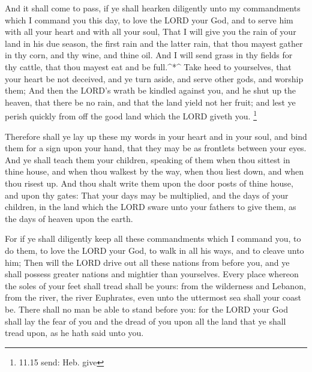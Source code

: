  And it shall come to pass, if ye shall hearken diligently
unto my commandments which I command you this day, to love the LORD your
God, and to serve him with all your heart and with all your soul,
 That I will give you the rain of your land in his due
season, the first rain and the latter rain, that thou mayest gather in
thy corn, and thy wine, and thine oil.  And I will send
grass in thy fields for thy cattle, that thou mayest eat and be
full.\^{}*\^{}  Take heed to yourselves, that your heart be
not deceived, and ye turn aside, and serve other gods, and worship them;
 And then the LORD's wrath be kindled against you, and he
shut up the heaven, that there be no rain, and that the land yield not
her fruit; and lest ye perish quickly from off the good land which the
LORD giveth you. \footnote{11.15 send: Heb. give}

 Therefore shall ye lay up these my words in your heart and
in your soul, and bind them for a sign upon your hand, that they may be
as frontlets between your eyes.  And ye shall teach them
your children, speaking of them when thou sittest in thine house, and
when thou walkest by the way, when thou liest down, and when thou risest
up.  And thou shalt write them upon the door posts of thine
house, and upon thy gates:  That your days may be
multiplied, and the days of your children, in the land which the LORD
sware unto your fathers to give them, as the days of heaven upon the
earth.

 For if ye shall diligently keep all these commandments
which I command you, to do them, to love the LORD your God, to walk in
all his ways, and to cleave unto him;  Then will the LORD
drive out all these nations from before you, and ye shall possess
greater nations and mightier than yourselves.  Every place
whereon the soles of your feet shall tread shall be yours: from the
wilderness and Lebanon, from the river, the river Euphrates, even unto
the uttermost sea shall your coast be.  There shall no man
be able to stand before you: for the LORD your God shall lay the fear of
you and the dread of you upon all the land that ye shall tread upon, as
he hath said unto you.

